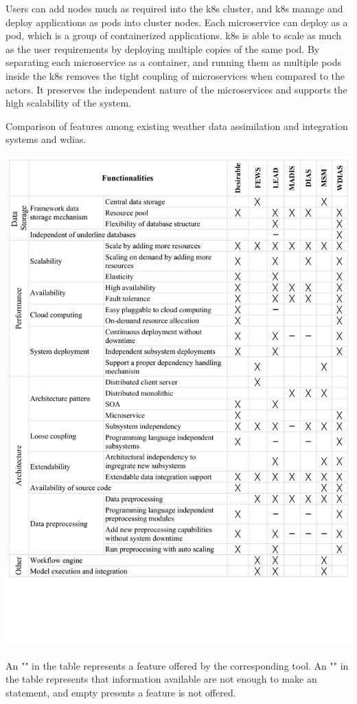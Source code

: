 Users can add nodes much as required into the \acrshort{k8s} cluster, and \acrshort{k8s} manage and deploy applications as pods into cluster nodes. Each microservice can deploy as a pod, which is a group of containerized applications. \acrshort{k8s} is able to scale as much as the user requirements by deploying multiple copies of the same pod. By separating each microservice as a container, and running them as multiple pods inside the \acrshort{k8s} removes the tight coupling of microservices when compared to the actors. It preserves the independent nature of the microservices and supports the high scalability of the system.

\begin{table}[htp]
    \caption{Comparison of features among existing weather data assimilation and integration systems and \acrshort{wdias}. }
    \includegraphics[width=1.05\textwidth]{method/misc/architecture_comparison_pros_cons.pdf}
    \label{tab:architecture_comparison}
    {\raggedright \footnotesize An "\Cross" in the table represents a feature offered by the corresponding tool. An "\SmallHBar" in the table represents that information available are not enough to make an statement, and empty presents a feature is not offered. \par}
\end{table}

